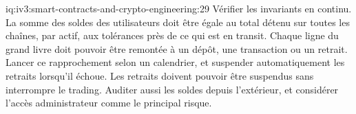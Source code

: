 \begin{solution}{iq:iv3:smart-contracts-and-crypto-engineering:29}
Vérifier les invariants en continu. La somme des soldes des utilisateurs doit être égale au total détenu sur toutes les chaînes, par actif, aux tolérances près de ce qui est en transit. Chaque ligne du grand livre doit pouvoir être remontée à un dépôt, une transaction ou un retrait. Lancer ce rapprochement selon un calendrier, et suspender automatiquement les retraits lorsqu'il échoue. Les retraits doivent pouvoir être suspendus sans interrompre le trading. Auditer aussi les soldes depuis l'extérieur, et considérer l'accès administrateur comme le principal risque.

\end{solution}


